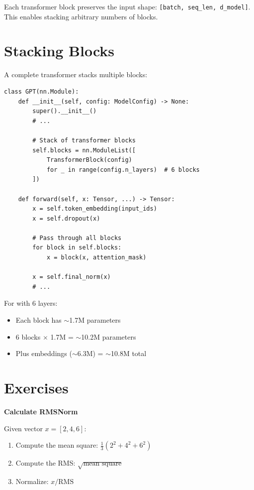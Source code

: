 \begin{keypoint}
Each transformer block preserves the input shape: \texttt{[batch, seq\_len, d\_model]}. This enables stacking arbitrary numbers of blocks.
\end{keypoint}

\section{Stacking Blocks}

A complete transformer stacks multiple blocks:

\begin{lstlisting}[style=python, caption={Stacking transformer blocks from model.py}]
class GPT(nn.Module):
    def __init__(self, config: ModelConfig) -> None:
        super().__init__()
        # ...

        # Stack of transformer blocks
        self.blocks = nn.ModuleList([
            TransformerBlock(config)
            for _ in range(config.n_layers)  # 6 blocks
        ])

    def forward(self, x: Tensor, ...) -> Tensor:
        x = self.token_embedding(input_ids)
        x = self.dropout(x)

        # Pass through all blocks
        for block in self.blocks:
            x = block(x, attention_mask)

        x = self.final_norm(x)
        # ...
\end{lstlisting}

For \TryLM with 6 layers:
\begin{itemize}
    \item Each block has $\sim$1.7M parameters
    \item 6 blocks $\times$ 1.7M = $\sim$10.2M parameters
    \item Plus embeddings ($\sim$6.3M) = $\sim$10.8M total
\end{itemize}

\section{Exercises}

\begin{exercise}
\textbf{Calculate RMSNorm}

Given vector $x = [2, 4, 6]$:
\begin{enumerate}
    \item Compute the mean square: $\frac{1}{3}(2^2 + 4^2 + 6^2)$
    \item Compute the RMS: $\sqrt{\text{mean square}}$
    \item Normalize: $x / \text{RMS}$
\end{enumerate}
\end{exercise}

